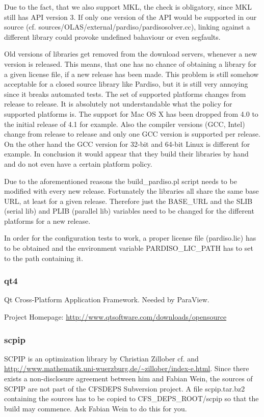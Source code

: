 \begin{description}
    \subitem Due to the fact, that we also support MKL, the check is obligatory, since MKL still has API version 3. If only one version of the API would be supported in our source (cf. sources/OLAS/external/pardiso/pardisosolver.cc), linking against a different library could provoke undefined bahaviour or even segfaults.
  \item[Distribution policy]
    \subitem Old versions of libraries get removed from the download servers, whenever a new version is released. This means, that one has no chance of obtaining a library for a given license file, if a new release has been made. This problem is still somehow acceptable for a closed source library like Pardiso, but it is still very annoying since it breaks automated tests.
    \subitem The set of supported platforms changes from release to release. It is absolutely not understandable what the policy for supported platforms is. The support for Mac OS X has been dropped from 4.0 to the initial release of 4.1 for example. Also the compiler versions (GCC, Intel) change from release to release and only one GCC version is supported per release. On the other hand the GCC version for 32-bit and 64-bit Linux is different for example. In conclusion it would appear that they build their libraries by hand and do not even have a certain platform policy.
\end{description}

Due to the aforementioned reasons the build\_pardiso.pl script needs to be modified with every new release. Fortunately the libraries all share the same base URL, at least for a given release. Therefore just the BASE\_URL and the SLIB (serial lib) and PLIB (parallel lib) variables need to be changed for the different platforms for a new release.

In order for the configuration tests to work, a proper license file (pardiso.lic) has to be obtained and the environment variable PARDISO\_LIC\_PATH has to set to the path containing it.

\subsubsection{qt4} Qt Cross-Platform Application Framework. Needed by ParaView.

\noindent Project Homepage: \url{http://www.qtsoftware.com/downloads/opensource}

\subsubsection{scpip} SCPIP  is an optimization library  by Christian Zillober
{cf.                           \cite{Zillober2002}                         and
\url{http://www.mathematik.uni-wuerzburg.de/~zillober/index-e.html}}.     Since
there  exists a  non-disclosure agreement  between  him and  Fabian Wein,  the
sources  of SCPIP  are not  part  of the  CFSDEPS Subversion  project. A  file
scpip.tar.bz2 containing the sources has to be copied to CFS\_DEPS\_ROOT/scpip
so that the build may commence. Ask Fabian Wein to do this for you.

